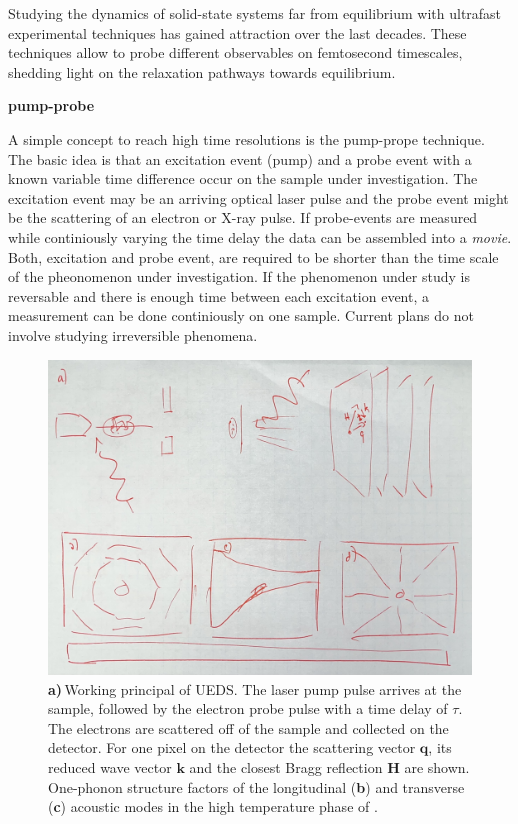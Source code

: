 Studying the dynamics of solid-state systems far from equilibrium with ultrafast experimental techniques has gained attraction over the last decades.
These techniques allow to probe different observables on femtosecond timescales, shedding light on the relaxation pathways towards equilibrium.

\textbf{pump-probe}

A simple concept to reach high time resolutions is the pump-prope technique.
The basic idea is that an excitation event (pump) and a probe event with a known variable time difference occur on the sample under investigation.
The excitation event may be an arriving optical laser pulse and the probe event might be the scattering of an electron or X-ray pulse.
If probe-events are measured while continiously varying the time delay the data can be assembled into a \emph{movie}.
Both, excitation and probe event, are required to be shorter than the time scale of the pheonomenon under investigation.
If the phenomenon under study is reversable and there is enough time between each excitation event, a measurement can be done continiously on one sample.
Current plans do not involve studying irreversible phenomena.

\begin{figure}[!t]
	\includegraphics[width=\columnwidth]{figs/method_placeholder.jpg}
	\caption{\textbf{a)}\,Working principal of \acs{UEDS}. The laser pump pulse arrives at the sample, followed by the electron probe pulse with a time delay of $\tau$. The electrons are scattered off of the sample and collected on the detector. For one pixel on the detector the scattering vector $\mathbf{q}$, its reduced wave vector $\mathbf{k}$ and the closest Bragg reflection $\mathbf{H}$ are shown. One-phonon structure factors of the longitudinal (\textbf{b}) and transverse (\textbf{c}) acoustic modes in the high temperature phase of \ts.}
	\label{fig:method}
\end{figure}

